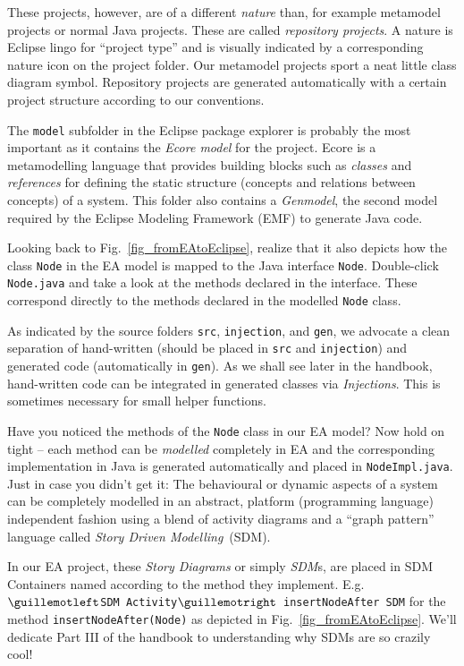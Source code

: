 These projects, however, are of a different \emph{nature} than, for example metamodel projects or normal Java projects. These are called \emph{repository
projects}. A nature is Eclipse lingo for ``project type'' and is visually indicated by a corresponding nature icon on the project folder.
Our metamodel projects sport a neat little class diagram symbol. Repository projects are generated automatically with a certain project structure according to
our conventions.

The \texttt{model} subfolder in the Eclipse package explorer is probably the most important as it contains the \emph{Ecore model} for the project. Ecore is a
metamodelling language that provides building blocks such as \emph{classes} and \emph{references} for defining the  static structure (concepts and relations
between concepts) of a system. This folder also contains a \emph{Genmodel}, the second model required by the Eclipse Modeling Framework (EMF) to generate Java
code.


Looking back to Fig.~\ref{fig_fromEAtoEclipse}, realize that it also depicts how the class \texttt{Node} in the EA model is mapped to the Java interface
\texttt{Node}. Double-click \texttt{Node.java} and take a look at the methods declared in the interface. These correspond directly to the methods declared in
the modelled \texttt{Node} class.

As indicated by the source folders \texttt{src}, \texttt{injection}, and \texttt{gen}, we advocate a clean separation of hand-written (should be placed in
\texttt{src} and \texttt{injection}) and generated code (automatically in \texttt{gen}). As we shall see later in the handbook, hand-written code can be
integrated in generated classes via \emph{Injections}. This is sometimes necessary for small helper functions.

Have you noticed the methods of the \texttt{Node} class in our EA model?  Now hold on tight -- each method can be \emph{modelled} completely in EA and the
corresponding implementation in Java is generated automatically and placed in \texttt{NodeImpl.java}.
Just in case you didn't get it: The behavioural or dynamic aspects of a system can be completely modelled in an abstract, platform (programming language)
independent fashion using a blend of activity  diagrams and a ``graph pattern'' language called \textit{Story Driven Modelling}~(SDM).


In our EA project, these \emph{Story Diagrams} or simply \emph{SDM}s, are placed in SDM Containers named according to the method they implement.
E.g.  \texttt{$\guillemotleft$SDM Activity$\guillemotright$ insertNodeAfter SDM} for the method \texttt{insertNodeAft\-er(Node)} as depicted in
Fig.~\ref{fig_fromEAtoEclipse}.  We'll dedicate Part III of the handbook to understanding why SDMs are so  {\huge crazily} cool!

